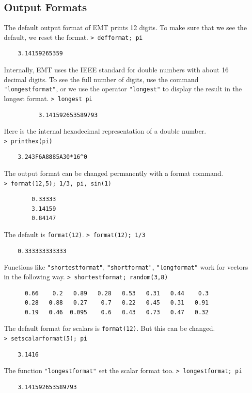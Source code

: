 \documentclass[11pt, a4paper]{article}
\newcommand{\emtcmd}[1]{\noindent\texttt{\textcolor{emtcommand}{>}\ #1}\par\smallskip}
\begin{document}
\subsection*{Output Formats}

The default output format of EMT prints 12 digits. To make sure that we see the default, we reset the format.
\emtcmd{defformat; pi}
\begin{verbatim}
    3.14159265359
\end{verbatim}

Internally, EMT uses the IEEE standard for double numbers with about 16 decimal digits. To see the full number of digits, use the command \texttt{"longestformat"}, or we use the operator \texttt{"longest"} to display the result in the longest format.
\emtcmd{longest pi}
\begin{verbatim}
          3.141592653589793
\end{verbatim}

Here is the internal hexadecimal representation of a double number.
\emtcmd{printhex(pi)}
\begin{verbatim}
    3.243F6A8885A30*16^0
\end{verbatim}

The output format can be changed permanently with a format command.
\emtcmd{format(12,5); 1/3, pi, sin(1)}
\begin{verbatim}
        0.33333
        3.14159
        0.84147
\end{verbatim}

The default is \texttt{format(12)}.
\emtcmd{format(12); 1/3}
\begin{verbatim}
    0.333333333333
\end{verbatim}

Functions like \texttt{"shortestformat"}, \texttt{"shortformat"}, \texttt{"longformat"} work for vectors in the following way.
\emtcmd{shortestformat; random(3,8)}
\begin{verbatim}
      0.66    0.2   0.89   0.28   0.53   0.31   0.44    0.3
      0.28   0.88   0.27    0.7   0.22   0.45   0.31   0.91
      0.19   0.46  0.095    0.6   0.43   0.73   0.47   0.32
\end{verbatim}

The default format for scalars is \texttt{format(12)}. But this can be changed.
\emtcmd{setscalarformat(5); pi}
\begin{verbatim}
    3.1416
\end{verbatim}

The function \texttt{"longestformat"} set the scalar format too.
\emtcmd{longestformat; pi}
\begin{verbatim}
    3.141592653589793
\end{verbatim}
\end{document}
